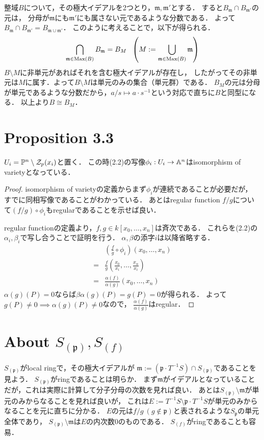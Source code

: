 \documentclass[a4paper]{jarticle}
\newcommand{\I}[1]{\mathfrak{#1}}
\begin{document}
    整域$B$について，その極大イデアルを2つとり，$\I{m}, \I{m}'$とする．
    すると$B_{\I{m}} \cap B_{\I{m}'}$の元は，
    分母が$\I{m}$にも$\I{m}'$にも属さない元であるような分数である．
    よって$B_{\I{m}} \cap B_{\I{m}'}=B_{\I{m} \cup \I{m}'}$．
    このように考えることで，以下が得られる．
    \[ \bigcap_{\I{m} \in \Max(B)} B_{\I{m}} = B_{M} ~~ \left( M:=\bigcup_{\I{m} \in \Max(B)} \I{m} \right) \]
    $B \setminus M$に非単元があればそれを含む極大イデアルが存在し，
    したがってその非単元は$M$に属す．よって$B \setminus M$は単元のみの集合（単元群）である．
    $B_M$の元は分母が単元であるような分数だから，$a/s \mapsto a \cdot s^{-1}$という対応で直ちに$B$と同型になる．
    以上より$B \cong B_M$．

\section{Proposition 3.3}
    \begin{Prop}
        $U_i = \mathbb{P}^n \setminus \mathcal{Z}_p(x_i)$と置く．
        この時(2.2)の写像$\phi_i: U_i \to \mathbb{A}^n$はisomorphism of varietyとなっている．
    \end{Prop}
    \begin{proof}
        isomorphism of varietyの定義からまず$\phi_i$が連続であることが必要だが，
        すでに同相写像であることがわかっている．
        あとはregular function $f/g$について$(f/g) \circ \phi_i$もregularであることを示せば良い．

        regular functionの定義より，$f,g \in k[x_0, \dots, x_n]$は斉次である．
        これらを(2.2)の$\alpha_i, \beta_i$で写し合うことで証明を行う．
        $\alpha, \beta$の添字$i$は以降省略する．
        \begin{align*}
            {}& \left( \frac{f}{g} \circ \phi_i \right)(x_0, \dots, x_n) \\
            =&  \frac{f}{g} \left( \frac{x_0}{x_i}, \dots, \frac{x_n}{x_i} \right) \\
            =&  \frac{\alpha(f)}{\alpha(g)} (x_0, \dots, x_n)
        \end{align*}
        $\alpha(g)(P)=0$ならば$\beta \alpha(g)(P)=g(P)=0$が得られる．
        よって$g(P) \neq 0 \implies \alpha(g)(P) \neq 0$なので，
        $\frac{\alpha(f)}{\alpha(g)}$はregular．
    \end{proof}

\section{About $S_{(\I{p})}, S_{(f)}$}
    $S_{(\I{p})}$がlocal ringで，その極大イデアルが
    $\I{m}:=(\I{p} \cdot T^{-1}S) \cap S_{(\I{p})}$であることを見よう．
    $S_{(\I{p})}$がringであることは明らか．
    まず$\I{m}$がイデアルとなっていることだが，これは実際に計算して分子分母の次数を見れば良い．
    あとは$S_{(\I{p})} \setminus \I{m}$が単元のみからなることを見れば良いが，
    これは$E:=T^{-1}S \setminus \I{p} \cdot T^{-1}S$が単元のみからなることを元に直ちに分かる．
    $E$の元は$f/g ~(g \not \in \I{p})$と表されるような$S_{\I{p}}$の単元全体であり，
    $S_{(\I{p})} \setminus \I{m}$は$E$の内次数0のものである．
    $S_{(f)}$がringであることも容易．
\end{document}
